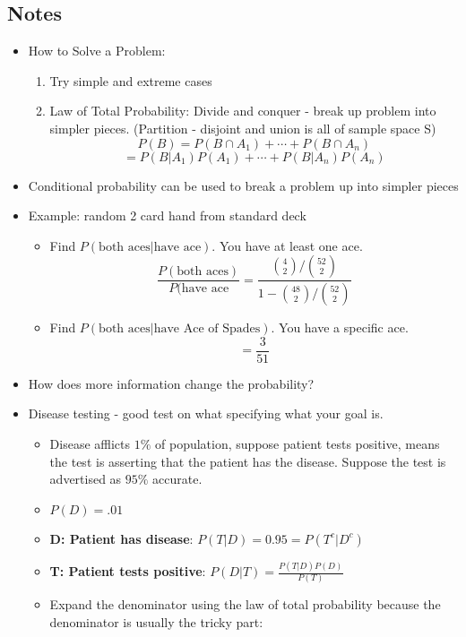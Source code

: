 \documentclass[11pt, oneside]{article}   	%
\begin{document}
	\subsection{Notes}
		\begin{itemize}
			\item How to Solve a Problem:
				\begin{enumerate}
					\item Try simple and extreme cases
					\item Law of Total Probability: Divide and conquer - break up problem into simpler pieces. (Partition - disjoint and union is all of sample space S)
						\[
							P(B) = P(B \cap A_1) + \cdots + P(B \cap A_n)
						\]
						\[
							= P(B|A_1)P(A_1) + \cdots + P(B|A_n)P(A_n)
						\]
				\end{enumerate}
			\item Conditional probability can be used to break a problem up into simpler pieces
			\item Example: random 2 card hand from standard deck
				\begin{itemize}
					\item Find $P(\text{both aces} | \text{have ace})$. You have at least one ace.
						\[
							\frac{P(\text{both aces})}{P(\text{have ace}} = \frac{\binom{4}{2} / \binom{52}{2}}{1 - \binom{48}{2}/\binom{52}{2}}
						\]
					\item Find $P(\text{both aces} | \text{have Ace of Spades})$. You have a specific ace.
						\[
							= \frac{3}{51}
						\]
				\end{itemize}
			\item How does more information change the probability?
			\item Disease testing - good test on what specifying what your goal is.
				\begin{itemize}
					\item Disease afflicts $1\%$ of population, suppose patient tests positive, means the test is asserting that the patient has the disease. Suppose the test is advertised as  $95\%$ accurate.
					\item $P(D) = .01$
					\item \textbf{D: Patient has disease}: $P(T|D) = 0.95 = P(T^{c} | D^{c})$
					\item \textbf{T: Patient tests positive}: $P(D|T)=\frac{P(T|D)P(D)}{P(T)}$		
					\item Expand the denominator using the law of total probability because the denominator is usually the tricky part:

\end{itemize}
\end{itemize}
\end{document}
